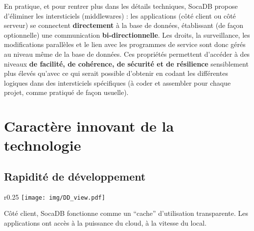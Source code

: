 \documentclass[a4paper,10pt]{scrreprt}
\begin{document}
        En pratique, et pour rentrer plus dans les détails techniques, SocaDB propose d'éliminer les intersticiels (middlewares) : les applications (côté client ou côté serveur) se connectent \textbf{directement} à la base de données, établissant (de façon optionnelle) une communication \textbf{bi-directionnelle}. Les droits, la surveillance, les modifications parallèles et le lien avec les programmes de service sont donc gérés au niveau même de la base de données. Ces propriétés permettent d'accéder à des niveaux \textbf{de facilité, de cohérence, de sécurité et de résilience} sensiblement plus élevés qu'avec ce qui serait possible d'obtenir en codant les différentes logiques dans des intersticiels spécifiques (à coder et assembler pour chaque projet, comme pratiqué de façon usuelle).
        
    \section{Caractère innovant de la technologie}
                
        \subsection{Rapidité de développement}

        

            \begin{wrapfigure}{r}{0.25\textwidth}
                \hfill
                \vspace{-1.2em}
                \texttt{[image: img/DD\_view.pdf]}
                \begin{center}
                \begin{scriptsize}
                    Côté client, SocaDB fonctionne comme un ``cache'' d'utilisation transparente. Les applications ont accès à la puissance du cloud, à la vitesse du local.
                \end{scriptsize}
                \end{center}
            \end{wrapfigure}
\end{document}
